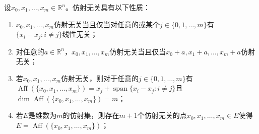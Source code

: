 \begin{property}\label{prop:AffineIndependence}
	设$x_0,x_1,\dots,x_m\in\mathbb{R}^n$。仿射无关具有以下性质：
	\begin{enumerate}
		\item $x_0,x_1,\dots,x_m$仿射无关当且仅当对任意的或某个$j\in\{0,1,\dots,m\}$有$\{x_i-x_j:i\neq j\}$线性无关；
		\item 对任意的$a\in\mathbb{R}^n$，$x_0,x_1,\dots,x_m$仿射无关当且仅当$x_0+a,x_1+a,\dots,x_m+a$仿射无关；
		\item 若$x_0,x_1,\dots,x_m$仿射无关，则对于任意的$j\in\{0,1,\dots,m\}$有$\operatorname{Aff}(\{x_0,x_1,\dots,x_m\})=x_j+\operatorname{span}\{x_i-x_j:i\ne j\}$且$\dim\operatorname{Aff}(\{x_0,x_1,\dots,x_m\})=m$；
		\item 若$E$是维数为$m$的仿射集，则存在$m+1$个仿射无关的点$x_0,x_1,\dots,x_m\in E$使得$E=\operatorname{Aff}(\{x_0,x_1,\dots,x_m\})$；
	\end{enumerate}
\end{property}
